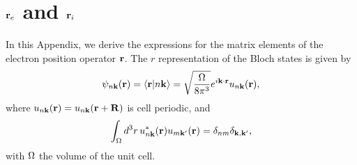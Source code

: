 \section{\texorpdfstring{$\mathbf{r}_e$ and $\mathbf{r}_i$}{Re and Ri}}
\label{reri}
In this Appendix, we derive the expressions for the matrix elements of
the electron position operator $\mathbf{r}$. 
The $r$ representation of the
Bloch states is given by
\begin{align}\label{bloch}
\psi_{n\mathbf{k}}(\mathbf{r})=\langle {\mathbf{r}} | {n\mathbf{k}} \rangle=\sqrt{\frac{\Omega}{8\pi^3}}
e^{i\mathbf{k} \cdot \mathbf{r}}u_{n\mathbf{k}}(\mathbf{r})
,
\end{align}
where
$u_{n\mathbf{k}}(\mathbf{r})=u_{n\mathbf{k}}(\mathbf{r}+\mathbf{R})$ is cell periodic, and
\begin{align}\label{normal}
\int_{\Omega}d^{3}r\, u_{n\mathbf{k}}^{*}(\mathbf{r})u_{m\mathbf{k}'}(\mathbf{r})=\delta_{nm}\delta_{\mathbf{\mathbf{k},\mathbf{k}'}}
,
\end{align}
with $\Omega$ the volume of the unit cell.

